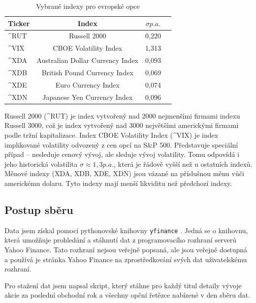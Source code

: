 \documentclass[male,czech,api_bc]{kitheses}
\begin{document}
 \begin{table}[h]
   \centering
   \caption{Vybrané indexy pro evropské opce}
   \label{tab:selected_indices}
   \begin{tabular}{lccc}
     \toprule
     \textbf{Ticker} & \textbf{Index} & \(\sigma p.a.\) \\
     \midrule
     \^{}RUT & Russell 2000                      & 0{,}220 \\
     \^{}VIX & CBOE Volatility Index             & 1{,}313 \\
     \^{}XDA & Australian Dollar Currency Index  & 0{,}093 \\
     \^{}XDB & British Pound Currency Index      & 0{,}069 \\
     \^{}XDE & Euro Currency Index               & 0{,}074 \\
     \^{}XDN & Japanese Yen Currency Index       & 0{,}096 \\
     \bottomrule
   \end{tabular}
 \end{table}

 Russell 2000 (\textasciicircum{}RUT) je index vytvořený nad 2000 nejmenšími firmami indexu Russell 3000, což je index vytvořený nad 3000 největšími americkými firmami podle tržní kapitalizace.
 Index CBOE Volatility Index (\textasciicircum{}VIX) je index implikované volatility odvozený z cen opcí na S\&P 500. Představuje speciální případ – nesleduje cenový vývoj, ale sleduje vývoj volatility. Tomu odpovídá i jeho historická volatilita \(\sigma \approx 1{,}3 p.a.\), která je řádově vyšší než u ostatních indexů.
 Měnové indexy (XDA, XDB, XDE, XDN) jsou vázané na příslušnou měnu vůči americkému dolaru. Tyto indexy mají menší likviditu než předchozí indexy.

  \subsection{Postup sběru}

  Data jsem získal pomocí pythonovské knihovny \texttt{yfinance} \parencites{yfinance}. Jedná se o knihovnu, která umožňuje prohledání a stáhnutí dat z programovacího rozhraní serverů Yahoo Finance. Tato rozhraní nejsou veřejně popsaná, ale jsou veřejně dostupná a používá je stránka Yahoo Finance na zprostředkování svých dat uživatelskému rozhraní.

  Pro stažení dat jsem napsal skript, který stáhne pro každý titul detaily vývoje akcie za poslední obchodní rok a všechny opční řetězce nabízené v den sběru dat.
\end{document}
